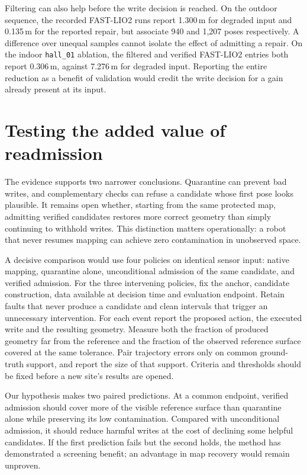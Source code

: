 \documentclass[conference]{IEEEtran}
\begin{document}
Filtering can also help before the write decision is reached. On the outdoor sequence, the recorded FAST-LIO2 runs report 1.300\,m for degraded input and 0.135\,m for the reported repair, but associate 940 and 1,207 poses respectively. A difference over unequal samples cannot isolate the effect of admitting a repair. On the indoor \texttt{hall\_01} ablation, the filtered and verified FAST-LIO2 entries both report 0.306\,m, against 7.276\,m for degraded input. Reporting the entire reduction as a benefit of validation would credit the write decision for a gain already present at its input.

\section{Testing the added value of readmission}
The evidence supports two narrower conclusions. Quarantine can prevent bad writes, and complementary checks can refuse a candidate whose first pose looks plausible. It remains open whether, starting from the same protected map, admitting verified candidates restores more correct geometry than simply continuing to withhold writes. This distinction matters operationally: a robot that never resumes mapping can achieve zero contamination in unobserved space.

A decisive comparison would use four policies on identical sensor input: native mapping, quarantine alone, unconditional admission of the same candidate, and verified admission. For the three intervening policies, fix the anchor, candidate construction, data available at decision time and evaluation endpoint. Retain faults that never produce a candidate and clean intervals that trigger an unnecessary intervention. For each event report the proposed action, the executed write and the resulting geometry. Measure both the fraction of produced geometry far from the reference and the fraction of the observed reference surface covered at the same tolerance. Pair trajectory errors only on common ground-truth support, and report the size of that support. Criteria and thresholds should be fixed before a new site's results are opened.

Our hypothesis makes two paired predictions. At a common endpoint, verified admission should cover more of the visible reference surface than quarantine alone while preserving its low contamination. Compared with unconditional admission, it should reduce harmful writes at the cost of declining some helpful candidates. If the first prediction fails but the second holds, the method has demonstrated a screening benefit; an advantage in map recovery would remain unproven.
\end{document}
